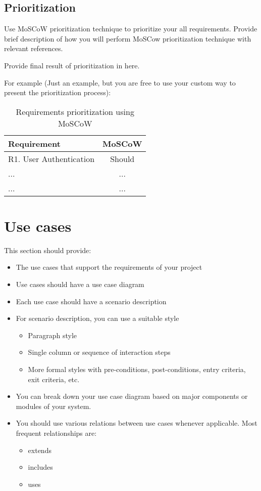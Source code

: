 
\subsection{Prioritization} %
\label{sub:prioritization}

Use MoSCoW prioritization technique to prioritize your all requirements. Provide brief description of how you will perform MoSCow prioritization technique with relevant references.

Provide final result of prioritization in here.

For example (Just an example, but you are free to use your custom way to present the prioritization process):
\begin{table}[htb!]
  \centering
\begin{tabular}{l|c}
  \bf{Requirement} & \bf{MoSCoW}\\ \hline\hline
  R1. User Authentication & Should \\ \hline
  ... & ... \\ \hline
  ... & ... \\ \hline
\end{tabular}
  \caption{Requirements prioritization using MoSCoW}
  \label{tab:moscow}
\end{table}

\section{Use cases} %
\label{sec:use_cases}
This section should provide:
\begin{itemize}
	\item The use cases that support the requirements of your project
	\item Use cases should have a use case diagram
	\item Each use case should have a scenario description
	\item For scenario description, you can use a suitable style
	\begin{itemize}
		\item Paragraph style
		\item Single column or sequence of interaction steps
		\item More formal styles with pre-conditions, post-conditions, entry criteria, exit criteria, etc.
	\end{itemize}
	\item You can break down your use case diagram based on major components or modules of your system. 
	\item You should use various relations between use cases whenever applicable. Most frequent relationships are: 
	\begin{itemize}
		\item extends
		\item includes
		\item uses
	\end{itemize}
\end{itemize}

